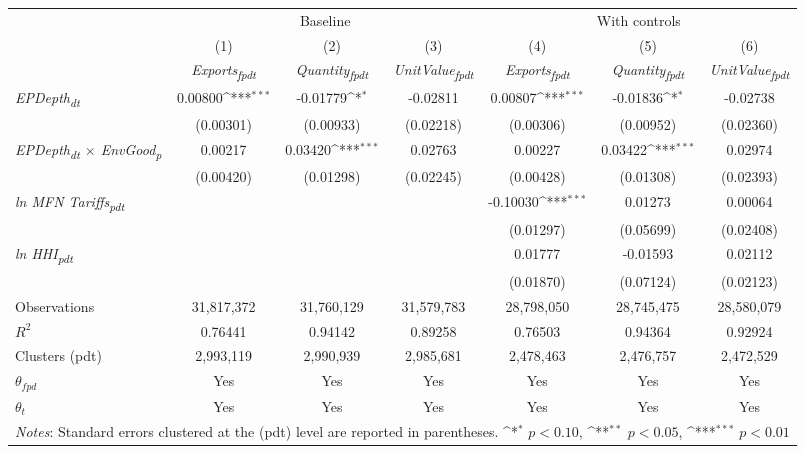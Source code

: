{
\def\sym#1{\ifmmode^{#1}\else\(^{#1}\)\fi}
\begin{tabular}{l*{6}{c}}
\toprule
&\multicolumn{3}{c}{Baseline}&\multicolumn{3}{c}{With controls}\\\cmidrule(lr){2-4}\cmidrule(lr){5-7}
&(1)&(2)&(3)&(4)&(5)&(6)\\
&\textit{Exports\textsubscript{fpdt}}&\textit{Quantity\textsubscript{fpdt}}&\textit{UnitValue\textsubscript{fpdt}}&\textit{Exports\textsubscript{fpdt}}&\textit{Quantity\textsubscript{fpdt}}&\textit{UnitValue\textsubscript{fpdt}}\\
\midrule
\textit{EPDepth\textsubscript{dt}} & 0.00800\sym{***} & -0.01779\sym{*} & -0.02811 & 0.00807\sym{***} & -0.01836\sym{*} & -0.02738\\
 & (0.00301) & (0.00933) & (0.02218) & (0.00306) & (0.00952) & (0.02360)\\
\addlinespace
\textit{EPDepth\textsubscript{dt} $\times$ EnvGood\textsubscript{p}} & 0.00217 & 0.03420\sym{***} & 0.02763 & 0.00227 & 0.03422\sym{***} & 0.02974\\
 & (0.00420) & (0.01298) & (0.02245) & (0.00428) & (0.01308) & (0.02393)\\
\addlinespace
\textit{ln MFN Tariffs\textsubscript{pdt}} &  &  &  & -0.10030\sym{***} & 0.01273 & 0.00064\\
 &  &  &  & (0.01297) & (0.05699) & (0.02408)\\
\addlinespace
\textit{ln HHI\textsubscript{pdt}} &  &  &  & 0.01777 & -0.01593 & 0.02112\\
 &  &  &  & (0.01870) & (0.07124) & (0.02123)\\
\midrule
Observations & 31,817,372 & 31,760,129 & 31,579,783 & 28,798,050 & 28,745,475 & 28,580,079\\
$R^{2}$ & 0.76441 & 0.94142 & 0.89258 & 0.76503 & 0.94364 & 0.92924\\
Clusters (pdt) & 2,993,119 & 2,990,939 & 2,985,681 & 2,478,463 & 2,476,757 & 2,472,529\\
$\theta_{fpd}$ & Yes & Yes & Yes & Yes & Yes & Yes\\
$\theta_{t}$ & Yes & Yes & Yes & Yes & Yes & Yes\\
\bottomrule
\multicolumn{7}{l}{\footnotesize \textit{Notes}: Standard errors clustered at the (pdt) level are reported in parentheses. \sym{*} \(p<0.10\), \sym{**} \(p<0.05\), \sym{***} \(p<0.01\)}\\
\end{tabular}
}
